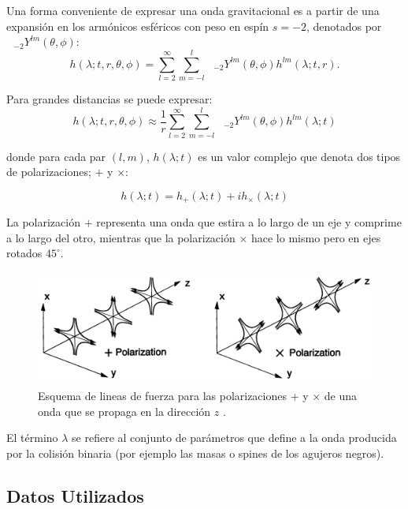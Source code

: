 Una forma conveniente de expresar una onda gravitacional es a partir de una expansión en los armónicos esféricos con peso en espín $s=-2$, denotados por $\text{ }_{-2} Y^{lm} (\theta, \phi)$:
\begin{equation}
h( \lambda; t, r, \theta , \phi) =  \sum_{l=2}^{\infty}  \sum_{m=-l}^{l} \text{ }_{-2} Y^{lm} (\theta, \phi) h^{lm}(\lambda; t, r).
\end{equation}


Para grandes distancias se puede expresar:
\begin{equation} \label{eq:modes}
h( \lambda; t, r, \theta , \phi) \approx \frac{1}{r}  \sum_{l=2}^{\infty}  \sum_{m=-l}^{l} \text{ }_{-2} Y^{lm} (\theta, \phi) h^{lm}(\lambda; t)
\end{equation}

donde para cada par $(l, m)$, $h(\lambda; t)$ es un valor complejo que denota dos tipos de polarizaciones; $+$ y $\times$:

\begin{equation}
h(\lambda; t) = h_{+}(\lambda; t) + i h_{\times}(\lambda; t)
\end{equation}

La polarización $+$ representa una onda que estira a lo largo de un eje y comprime a lo largo del otro, mientras que la polarización $\times$ hace lo mismo pero en ejes rotados $45^{\circ}$.



\begin{figure}[h!]
\centering
\includegraphics[width=.75\columnwidth]{figs/polarizaciones.png}
\caption{Esquema de lineas de fuerza para las polarizaciones + y $\times$ de una onda que se propaga en la dirección $z$ \cite{Centrella_2010}.}
\label{fig:+x}
\end{figure}


El término $\lambda$ se refiere al conjunto de parámetros que define a la onda producida por la colisión binaria (por ejemplo las masas o spines de los agujeros negros).


\subsection*{Datos Utilizados}

